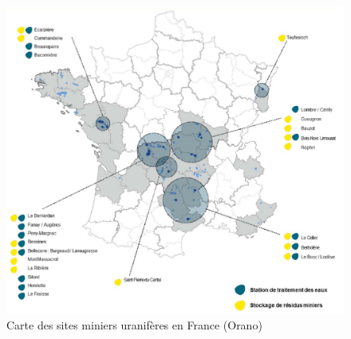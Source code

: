 \documentclass{article}
\begin{document}
\begin{figure}[H]
    \centering
    \includegraphics[width=\textwidth]{I_A_2.png}
    \caption{Carte des sites miniers uranifères en France (Orano)}
    \label{fig:sites_orano}
\end{figure}
\newpage



\end{document}
